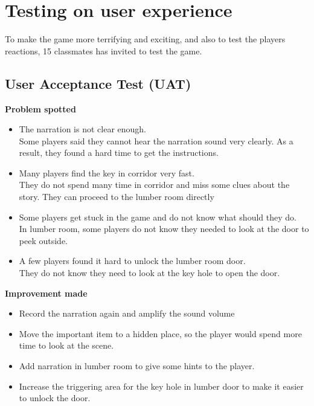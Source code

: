 \documentclass{article}
\begin{document}
\clearpage

\section{Testing on user experience}
To make the game more terrifying and exciting, and also to test the players reactions, 15 classmates has invited to test the game.
\subsection{User Acceptance Test (UAT)}
\textbf{Problem spotted}
\begin{itemize}
\item The narration is not clear enough.\\
Some players said they cannot hear the narration sound very clearly. As a result, they found a hard time to get the instructions.
\item Many players find the key in corridor very fast.\\
They do not spend many time in corridor and miss some clues about the story. They can proceed to the lumber room directly
\item Some players get stuck in the game and do not know what should they do.\\
In lumber room, some players do not know they needed to look at the door to peek outside.
\item A few players found it hard to unlock the lumber room door.\\
They do not know they need to look at the key hole to open the door.
\end{itemize}
\textbf{Improvement made}
\begin{itemize}
\item Record the narration again and amplify the sound volume
\item Move the important item to a hidden place, so the player would spend more time to look at the scene.
\item Add narration in lumber room to give some hints to the player.
\item Increase the triggering area for the key hole in lumber door to make it easier to unlock the door.
\end{itemize}

\clearpage
\end{document}
